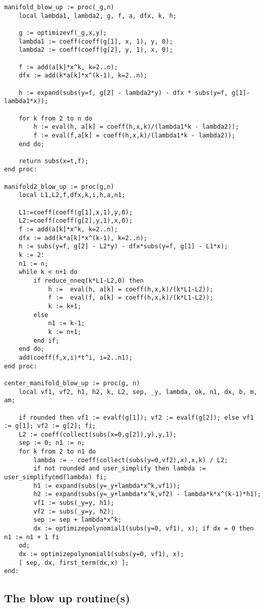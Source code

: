 \documentclass[a4paper,10pt]{article}
\begin{document}
\begin{lstlisting}[name=blowup]
manifold_blow_up := proc(_g,n)
    local lambda1, lambda2, g, f, a, dfx, k, h;

    g := optimizevf(_g,x,y);
    lambda1 := coeff(coeff(g[1], x, 1), y, 0);
    lambda2 := coeff(coeff(g[2], y, 1), x, 0);

    f := add(a[k]*x^k, k=2..n);
    dfx := add(k*a[k]*x^(k-1), k=2..n);

    h := expand(subs(y=f, g[2] - lambda2*y) - dfx * subs(y=f, g[1]-lambda1*x));

    for k from 2 to n do
        h := eval(h, a[k] = coeff(h,x,k)/(lambda1*k - lambda2));
        f := eval(f,a[k] = coeff(h,x,k)/(lambda1*k - lambda2));
    end do;

    return subs(x=t,f);
end proc:

manifold2_blow_up := proc(g,n)
    local L1,L2,f,dfx,k,i,h,a,n1;

    L1:=coeff(coeff(g[1],x,1),y,0);
    L2:=coeff(coeff(g[2],y,1),x,0);
    f := add(a[k]*x^k, k=2..n);
    dfx := add(k*a[k]*x^(k-1), k=2..n);
    h := subs(y=f, g[2] - L2*y) - dfx*subs(y=f, g[1] - L1*x);
    k := 2:
    n1 := n;
    while k < n+1 do
        if reduce_nneq(k*L1-L2,0) then
            h :=  eval(h, a[k] = coeff(h,x,k)/(k*L1-L2));
            f :=  eval(f, a[k] = coeff(h,x,k)/(k*L1-L2));
            k := k+1;
        else
            n1 := k-1;
            k := n+1;
        end if;
    end do;
    add(coeff(f,x,i)*t^i, i=2..n1);
end proc:

center_manifold_blow_up := proc(g, n)
    local vf1, vf2, h1, h2, k, L2, sep, _y, lambda, ok, n1, dx, b, m, am;

    if rounded then vf1 := evalf(g[1]); vf2 := evalf(g[2]); else vf1 := g[1]; vf2 := g[2]; fi;
    L2 := coeff(collect(subs(x=0,g[2]),y),y,1);
    sep := 0; n1 := n;
    for k from 2 to n1 do
        lambda := - coeff(collect(subs(y=0,vf2),x),x,k) / L2;
        if not rounded and user_simplify then lambda := user_simplifycmd(lambda) fi;
        h1 := expand(subs(y=_y+lambda*x^k,vf1));
        h2 := expand(subs(y=_y+lambda*x^k,vf2) - lambda*k*x^(k-1)*h1);
        vf1 := subs(_y=y, h1);
        vf2 := subs(_y=y, h2);
        sep := sep + lambda*x^k;
        dx := optimizepolynomial1(subs(y=0, vf1), x); if dx = 0 then n1 := n1 + 1 fi
    od;
    dx := optimizepolynomial1(subs(y=0, vf1), x);
    [ sep, dx, first_term(dx,x) ];
end:
\end{lstlisting}

\subsection{The blow up routine(s)}
\end{document}
